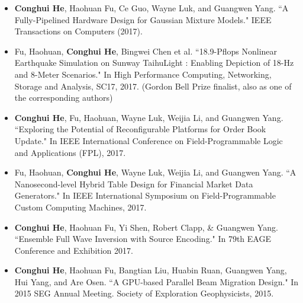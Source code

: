 \documentclass[localFont]{awesome-source-cv} %
\begin{document}

\begin{itemize}
	\item \textbf{Conghui He}, Haohuan Fu, Ce Guo, Wayne Luk, and Guangwen Yang. ``A Fully-Pipelined Hardware Design for Gaussian Mixture Models." IEEE Transactions on Computers (2017). \\
	\vspace{-3.5mm}
	\item Fu, Haohuan, \textbf{Conghui He}, Bingwei Chen et al. ``18.9-Pflops Nonlinear Earthquake Simulation on Sunway TaihuLight : Enabling Depiction of 18-Hz and 8-Meter Scenarios." In High Performance Computing, Networking, Storage and Analysis, SC17, 2017. (Gordon Bell Prize finalist, also as one of the corresponding authors) \\
	\vspace{-3mm}
	\item \textbf{Conghui He}, Fu, Haohuan, Wayne Luk, Weijia Li, and Guangwen Yang. ``Exploring the Potential of Reconfigurable Platforms for Order Book Update." In IEEE International Conference on Field-Programmable Logic and Applications (FPL), 2017. \\
	\vspace{-3.5mm}
	\item Fu, Haohuan, \textbf{Conghui He}, Wayne Luk, Weijia Li, and Guangwen Yang. ``A Nanosecond-level Hybrid Table Design for Financial Market Data Generators." In IEEE International Symposium on Field-Programmable Custom Computing Machines, 2017. \\
	\vspace{-3.5mm}
	\item \textbf{Conghui He}, Haohuan Fu, Yi Shen, Robert Clapp, \& Guangwen Yang. ``Ensemble Full Wave Inversion with Source Encoding." In 79th EAGE Conference and Exhibition 2017. \\
	\vspace{-3.5mm}
	\item \textbf{Conghui He}, Haohuan Fu, Bangtian Liu, Huabin Ruan, Guangwen Yang, Hui Yang, and Are Osen. ``A GPU-based Parallel Beam Migration Design." In 2015 SEG Annual Meeting. Society of Exploration Geophysicists, 2015.\\

\end{itemize}
\end{document}
